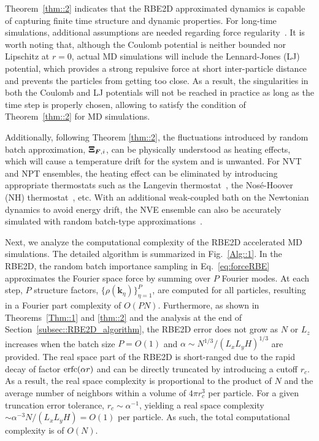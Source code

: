 Theorem~\ref{thm::2} indicates that the RBE2D approximated dynamics is capable of capturing finite time structure and dynamic properties.
For long-time simulations, additional assumptions are needed regarding force regularity~\cite{Jin2022MMS}. 
It   {is worth} noting that, although the Coulomb potential is neither bounded nor Lipschitz at $r=0$, actual MD simulations will include the Lennard-Jones (LJ) potential, which provides a  {strong repulsive force at short inter-particle distance and prevents the particles from getting too close. As a result, the singularities in both the Coulomb and LJ potentials will not be reached in practice as long as the time step is properly chosen, allowing to satisfy the condition of Theorem~\ref{thm::2}  for MD simulations.}

Additionally, following Theorem \ref{thm::2}, the fluctuations introduced by random batch approximation, $\boldsymbol{\Xi}_{\boldsymbol{F},i}$,  can be physically understood as heating effects, which will cause a temperature drift for the system and is unwanted. 
For NVT and NPT ensembles, the heating effect can be eliminated by introducing appropriate thermostats such as the Langevin thermostat~\cite{feller1995constant}, the Nos\'e-Hoover (NH) thermostat~\cite{hoover1985canonical}, etc. With an additional weak-coupled bath on the Newtonian dynamics to avoid energy drift, the NVE ensemble can also be accurately simulated with random batch-type approximations~\cite{liang2024JCP}.

Next, we analyze the computational complexity of the RBE2D accelerated MD simulations. The detailed algorithm is summarized in Fig.~\ref{Alg::1}.  
In the RBE2D, the random batch importance sampling in Eq.~\eqref{eq:forceRBE} approximates the Fourier space force by summing over $P$ Fourier modes. 
At each step, $P$ structure factors, $\{\rho(\bm{k}_{\eta})\}_{\eta=1}^{P}$, are computed for all particles, resulting in a Fourier part complexity of $O(PN)$. Furthermore, as shown in Theorems~\ref{Thm::1} and \ref{thm::2} and the analysis at the end of Section~\ref{subsec::RBE2D_algorithm}, the RBE2D error does not grow as $N$ or $L_z$ increases when the batch size $P=O(1)$ and $\alpha\sim N^{1/3}/(L_xL_yH)^{1/3}$ are provided. 
The real space part of the RBE2D is short-ranged due to the rapid decay of factor $\operatorname{erfc}(\alpha r)$ and can be directly truncated by introducing a cutoff $r_c$. 
As a result, the real space complexity is proportional to the product of $N$ and the average number of neighbors within a volume of $4\pi r_c^3$ per particle. 
For a given truncation error tolerance, $r_c\sim \alpha^{-1}$, yielding a real space complexity $\sim \alpha^{-3}N/(L_xL_yH)=O(1)$ per particle. 
As such, the total computational complexity is of $O(N)$. 

